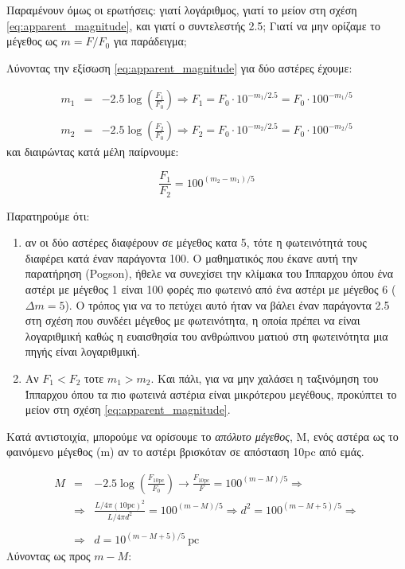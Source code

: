 Παραμένουν όμως οι ερωτήσεις: γιατί λογάριθμος, γιατί το μείον στη σχέση \eqref{eq:apparent_magnitude}, και γιατί ο συντελεστής 2.5; Γιατί να μην ορίζαμε το μέγεθος ως $m = F/F_0$ για παράδειγμα;

Λύνοντας την εξίσωση \eqref{eq:apparent_magnitude} για δύο αστέρες έχουμε:

\begin{eqnarray*}
    m_1 &=& -2.5 \log \left( \frac{F_1}{F_0} \right) \Rightarrow F_1 = F_0 \cdot 10^{-m_1/2.5} = F_0 \cdot 100^{-m_1/5} \\\\
    m_2 &=& -2.5 \log \left( \frac{F_2}{F_0} \right) \Rightarrow F_2 = F_0 \cdot 10^{-m_2/2.5} = F_0 \cdot 100^{-m_2/5}
\end{eqnarray*}
και διαιρώντας κατά μέλη παίρνουμε:

\begin{equation}
    \frac{F_1}{F_2} = 100^{(m_2 - m_1)/5}
\end{equation}

Παρατηρούμε ότι:
\begin{enumerate}
    \item αν οι δύο αστέρες διαφέρουν σε μέγεθος κατα 5, τότε η φωτεινότητά τους διαφέρει κατά έναν παράγοντα 100. Ο μαθηματικός που έκανε αυτή την παρατήρηση (Pogson), ήθελε να συνεχίσει την κλίμακα του Ίππαρχου όπου ένα αστέρι με μέγεθος 1 είναι 100 φορές πιο φωτεινό από ένα αστέρι με μέγεθος 6 ($\Delta m = 5$). Ο τρόπος για να το πετύχει αυτό ήταν να βάλει έναν παράγοντα 2.5 στη σχέση που συνδέει μέγεθος με φωτεινότητα, η οποία πρέπει να είναι λογαριθμική καθώς η ευαισθησία του ανθρώπινου ματιού στη φωτεινότητα μια πηγής είναι λογαριθμική.
    \item Αν $F_1 < F_2$ τοτε $m_1 > m_2$. Και πάλι, για να μην χαλάσει η ταξινόμηση του Ίππαρχου όπου τα πιο φωτεινά αστέρια είναι μικρότερου μεγέθους, προκύπτει το μείον στη σχέση \eqref{eq:apparent_magnitude}.
\end{enumerate}

Κατά αντιστοιχία, μπορούμε να ορίσουμε το \textit{απόλυτο μέγεθος}, M, ενός αστέρα ως το φαινόμενο μέγεθος (m) αν το αστέρι βρισκόταν σε απόσταση 10pc από εμάς.

\begin{eqnarray*}
    M &=& -2.5 \log \left( \frac{F_{10 \text{pc}}}{F_0} \right) \longrightarrow \frac{F_{10 \text{pc}}}{F} = 100^{(m-M)/5} \Rightarrow \\
    &\Rightarrow & \frac{\displaystyle L/4\pi (10 \text{pc})^2}{L/4 \pi d^2} = 100^{(m-M)/5} \Rightarrow d^2 = 100^{(m-M+5)/5} \Rightarrow \\\\
    & \Rightarrow & \boxed{d = 10^{(m-M+5)/5} \ \text{pc}}
\end{eqnarray*}
Λύνοντας ως προς $m-M$:

